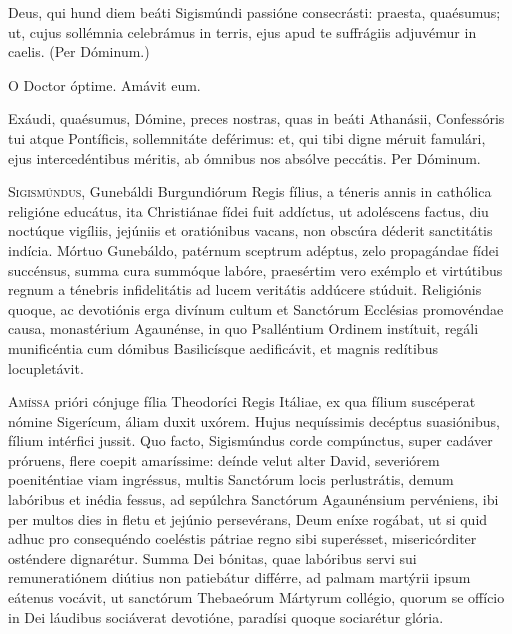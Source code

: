 \begin{caputFesti}
\end{caputFesti}


\parsOratio
Deus, qui hund diem beáti Sigismúndi passióne consecrásti:
praesta, quaésumus;
ut, cujus sollémnia celebrámus in terris,
ejus apud te suffrágiis adjuvémur in caelis.
(Per Dóminum.)

O Doctor óptime.
Amávit eum.

\parsOratio
Exáudi, quaésumus, Dómine, preces nostras,
quas in beáti Athanásii, Confessóris tui atque Pontíficis,
sollemnitáte deférimus:
et, qui tibi digne méruit famulári,
ejus intercedéntibus méritis,
ab ómnibus nos absólve peccátis.
Per Dóminum.

\horaNocturnusII


\lettrine{S}{igismúndus,} Gunebáldi Burgundiórum Regis fílius,
a téneris annis in cathólica religióne educátus,
ita Christiánae fídei fuit addíctus,
ut adoléscens factus, diu noctúque vigíliis, jejúniis et oratiónibus vacans,
non obscúra déderit sanctitátis indícia.
Mórtuo Gunebáldo, patérnum sceptrum adéptus,
zelo propagándae fídei succénsus,
summa cura summóque labóre, praesértim vero exémplo et virtútibus
regnum a ténebris infidelitátis ad lucem veritátis addúcere stúduit.
Religiónis quoque, ac devotiónis erga divínum cultum
et Sanctórum Ecclésias promovéndae causa,
monastérium Agaunénse, in quo Psalléntium Ordinem instítuit,
regáli munificéntia cum dómibus Basilicísque aedificávit,
et magnis redítibus locupletávit.



\lettrine{A}{míssa} prióri cónjuge fília Theodoríci Regis Itáliae,
ex qua fílium suscéperat nómine Sigerícum,
áliam duxit uxórem.
Hujus nequíssimis decéptus suasiónibus, fílium intérfici jussit.
Quo facto, Sigismúndus corde compúnctus, super cadáver próruens,
flere coepit amaríssime: deínde velut alter David,
severiórem poeniténtiae viam ingréssus, multis Sanctórum locis perlustrátis,
demum labóribus et inédia fessus, ad sepúlchra Sanctórum Agaunénsium pervéniens,
ibi per multos dies in fletu et jejúnio persevérans,
Deum eníxe rogábat, ut si quid adhuc pro consequéndo coeléstis pátriae
regno sibi superésset, misericórditer osténdere dignarétur.
Summa Dei bónitas, quae labóribus servi sui remuneratiónem
diútius non patiebátur différre,
ad palmam martýrii ipsum eátenus vocávit,
ut sanctórum Thebaeórum Mártyrum collégio,
quorum se offício in Dei láudibus sociáverat devotióne,
paradísi quoque sociarétur glória.


